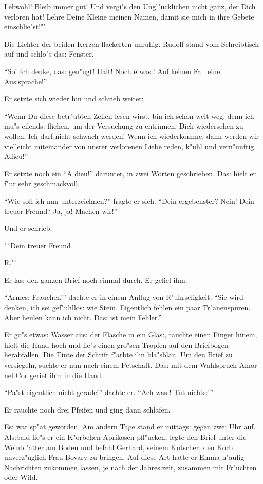 \documentclass[oneside,12pt]{book}
\newenvironment{antiqua}{\normalfont}{}%
\newcommand{\s}{s:}%
\begin{document}
Lebwohl! Bleib immer gut! Und vergi"s den Ungl"ucklichen nicht
ganz, der Dich verloren hat! Lehre Deine Kleine meinen Namen,
damit sie mich in ihre Gebete einschlie"st!"'

Die Lichter der beiden Kerzen flackerten unruhig. Rudolf stand vom
Schreibtisch auf und schlo"s da{\s} Fenster.

"`So! Ich denke, da{\s} gen"ugt! Halt! Noch etwa{\s}! Auf keinen
Fall eine Au{\s}sprache!"'

Er setzte sich wieder hin und schrieb weiter:

"`Wenn Du diese betr"ubten Zeilen lesen wirst, bin ich schon weit
weg, denn ich mu"s eilend{\s} fliehen, um der Versuchung zu
entrinnen, Dich wiedersehen zu wollen. Ich darf nicht schwach
werden! Wenn ich wiederkomme, dann werden wir vielleicht
miteinander von unsrer verlorenen Liebe reden, k"uhl und
vern"unftig. Adieu!"'

Er setzte noch ein "`A dieu!"' darunter, in zwei Worten
geschrieben. Da{\s} hielt er f"ur sehr geschmackvoll.

"`Wie soll ich nun unterzeichnen?"' fragte er sich. "`Dein
ergebenster? Nein! Dein treuer Freund? Ja, ja! Machen wir!"'

Und er schrieb:

\hfill "`Dein treuer Freund

\hfill R."' \hspace{3em}

Er la{\s} den ganzen Brief noch einmal durch. Er gefiel ihm.

"`Arme{\s} Frauchen!"' dachte er in einem Anflug von R"uhrseligkeit.
"`Sie wird denken, ich sei gef"uhllo{\s} wie Stein. Eigentlich
fehlen ein paar Tr"anenspuren. Aber heulen kann ich nicht. Da{\s}
ist mein Fehler."'

Er go"s etwa{\s} Wasser au{\s} der Flasche in ein Gla{\s}, tauchte
einen Finger hinein, hielt die Hand hoch und lie"s einen gro"sen
Tropfen auf den Briefbogen herabfallen. Die Tinte der Schrift
f"arbte ihn bla"sblau. Um den Brief zu versiegeln, suchte er nun
nach einem Petschaft. Da{\s} mit dem Wahlspruch
\begin{antiqua}Amor nel Cor\end{antiqua} geriet ihm in die Hand.

"`Pa"st eigentlich nicht gerade!"' dachte er. "`Ach wa{\s}! Tut
nicht{\s}!"'

Er rauchte noch drei Pfeifen und ging dann schlafen.

E{\s} war sp"at geworden. Am andern Tage stand er mittag{\s} gegen
zwei Uhr auf. Al{\s}bald lie"s er ein K"orbchen Aprikosen
pfl"ucken, legte den Brief unter die Weinbl"atter am Boden und
befahl Gerhard, seinem Kutscher, den Korb unverz"uglich Frau
Bovary zu bringen. Auf diese Art hatte er Emma h"aufig Nachrichten
zukommen lassen, je nach der Jahre{\s}zeit, zusammen mit Fr"uchten
oder Wild.
\end{document}
